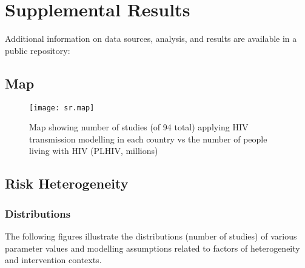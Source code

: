 \clearpage %
\section{Supplemental Results}\label{app.sr.res}
Additional information on data sources, analysis, and results are available
in a public repository:\\
\subsection{Map}\label{app.sr.res.map}
\begin{figure}[h]
  \centering
  \texttt{[image: sr.map]}
  \caption{Map showing number of studies (of 94 total)
    applying HIV transmission modelling in each country vs
    the number of people living with HIV (PLHIV, millions)}
  \label{fig:sr.map}
\end{figure}
\subsection{Risk Heterogeneity}\label{app.sr.res.risk}
\subsubsection{Distributions}
The following figures illustrate the distributions (number of studies)
of various parameter values and modelling assumptions related to
factors of heterogeneity and intervention contexts.
\par\bigskip
{}
\clearpage

